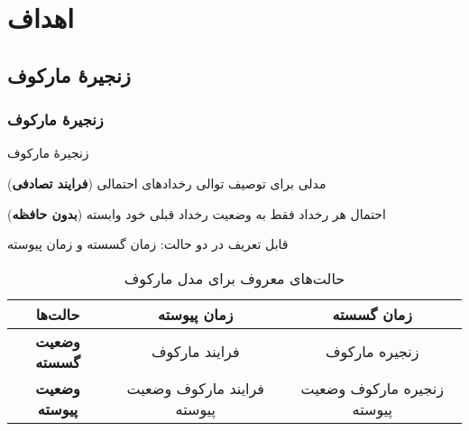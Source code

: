 \documentclass[xcolor=dvipsnames, professionalfonts, aspectratio=169, 11pt]{beamer}
\begin{document}
\section{اهداف}
\subsection{زنجیرهٔ مارکوف}
\begin{frame}
    \frametitle{زنجیرهٔ مارکوف}

    زنجیرهٔ مارکوف
    \begin{moredi}
        \item مدلی برای توصیف توالی رخدادهای احتمالی (\textbf{فرایند تصادفی})
        \item احتمال هر رخداد فقط به وضعیت رخداد قبلی خود وابسته (\textbf{بدون حافظه})
        \item قابل تعریف در دو حالت: زمان گسسته و زمان پیوسته
    \end{moredi}
    \pause
    \begin{table}
        \caption{حالت‌های معروف برای مدل مارکوف}
        \vspace{-1em}
        \small
        \begin{tabular}{|c|c|c|}
            \hline
            \textbf{حالت‌ها}       & \textbf{زمان پیوسته}       & \textbf{زمان گسسته}        \\
            \hline
            \textbf{وضعیت گسسته}  & فرایند مارکوف              & زنجیره مارکوف              \\
            \hline
            \textbf{وضعیت پیوسته} & فرایند مارکوف وضعیت پیوسته & زنجیره مارکوف وضعیت پیوسته \\
            \hline
        \end{tabular}
    \end{table}

\end{frame}
\end{document}
